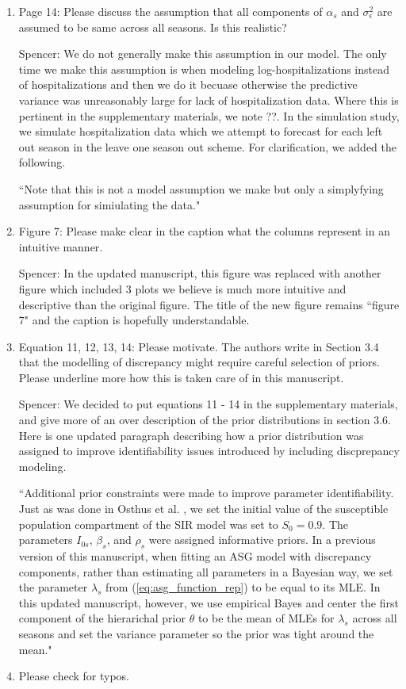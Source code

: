 \documentclass{article}
\newcommand{\spencer}[1]{{\color{blue} Spencer: #1}}
\begin{document}
\begin{enumerate}[-]
\item Page 14: Please discuss the assumption that all components of $\alpha_s$ and 
$\sigma_\epsilon^2$ are assumed to be same across all seasons. Is this realistic?

\spencer{We do not generally make this assumption in our model. The only time
we make this assumption is when modeling log-hospitalizations instead of 
hospitalizations and then we do it becuase otherwise the predictive variance
was unreasonably large for lack of hospitalization data.
Where this is pertinent in the supplementary materials, we note ??.
In the simulation study,
we simulate hospitalization data which we attempt to forecast for each left
out season in the leave one season out scheme. For clarification, we added 
the following.

``Note that this is not
a model assumption we make but only a simplyfying assumption for simiulating
the data."}

\item Figure 7: Please make clear in the caption what the columns represent in an 
intuitive manner. 

\spencer{In the updated manuscript, this figure was replaced with another figure
which included 3 plots we believe is much more intuitive and descriptive than
the original figure. The title of the new figure remains ``figure 7" and 
the caption is hopefully understandable.}

\item Equation 11, 12, 13, 14: Please motivate. The authors write in Section 3.4 
that the modelling of discrepancy might require careful selection of priors. 
Please underline more how this is taken care of in this manuscript.

\spencer{We decided to put equations 11 - 14 in the supplementary materials, and
give more of an over description of the prior distributions in section 3.6. Here
is one updated paragraph describing how a prior distribution was assigned to
improve identifiability issues introduced by including discprepancy modeling.

``Additional prior constraints were made to improve parameter identifiability. 
Just as was done in Osthus et al. \cite[]{osthus2019dynamic},
we set the initial value of the 
susceptible population compartment of the SIR model was set to $S_0 = 0.9$. 
The parameters $I_{0s}$, $\beta_s$, and $\rho_s$ were assigned informative 
priors. In a previous version of this manuscript, when fitting an ASG model
with discrepancy components,
rather than estimating all parameters in a Bayesian way,
we set the parameter $\lambda_s$ from (\ref{eq:asg_function_rep})
to be equal to its MLE. In this updated manuscript, 
however, we use empirical Bayes and center the first component of the 
hierarichal prior $\theta$ to be the mean of MLEs for $\lambda_s$ across
all seasons and set the variance parameter so the prior was tight around the
mean."}

\item Please check for typos.
  
\end{enumerate}
\end{document}
